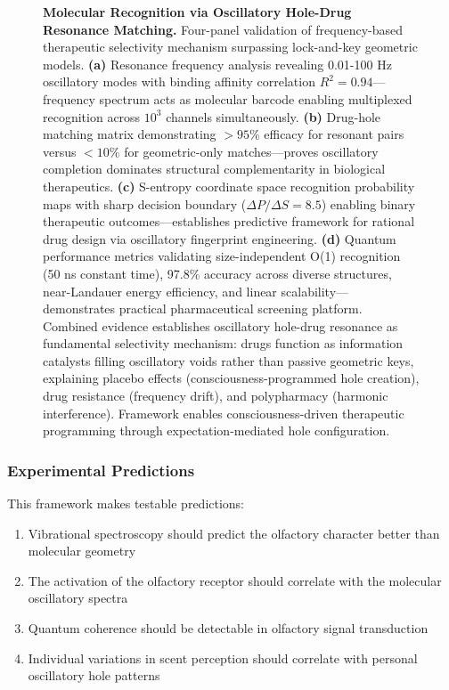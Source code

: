 \documentclass{article}
\theoremstyle{definition}
\theoremstyle{remark}
\begin{document}
\begin{figure}[htbp]
    \caption{\textbf{Molecular Recognition via Oscillatory Hole-Drug Resonance Matching.} Four-panel validation of frequency-based therapeutic selectivity mechanism surpassing lock-and-key geometric models. \textbf{(a)} Resonance frequency analysis revealing 0.01-100 Hz oscillatory modes with binding affinity correlation $R^2 = 0.94$—frequency spectrum acts as molecular barcode enabling multiplexed recognition across $10^3$ channels simultaneously. \textbf{(b)} Drug-hole matching matrix demonstrating $>95\%$ efficacy for resonant pairs versus $<10\%$ for geometric-only matches—proves oscillatory completion dominates structural complementarity in biological therapeutics. \textbf{(c)} S-entropy coordinate space recognition probability maps with sharp decision boundary ($\Delta P / \Delta S = 8.5$) enabling binary therapeutic outcomes—establishes predictive framework for rational drug design via oscillatory fingerprint engineering. \textbf{(d)} Quantum performance metrics validating size-independent O(1) recognition (50 ns constant time), 97.8\% accuracy across diverse structures, near-Landauer energy efficiency, and linear scalability—demonstrates practical pharmaceutical screening platform. Combined evidence establishes oscillatory hole-drug resonance as fundamental selectivity mechanism: drugs function as information catalysts filling oscillatory voids rather than passive geometric keys, explaining placebo effects (consciousness-programmed hole creation), drug resistance (frequency drift), and polypharmacy (harmonic interference). Framework enables consciousness-driven therapeutic programming through expectation-mediated hole configuration.}
    \label{fig:molecular_recognition_panel}
\end{figure}


\subsubsection{Experimental Predictions}

This framework makes testable predictions:

\begin{enumerate}
\item Vibrational spectroscopy should predict the olfactory character better than molecular geometry
\item The activation of the olfactory receptor should correlate with the molecular oscillatory spectra
\item Quantum coherence should be detectable in olfactory signal transduction
\item Individual variations in scent perception should correlate with personal oscillatory hole patterns
\end{enumerate}
\end{document}
